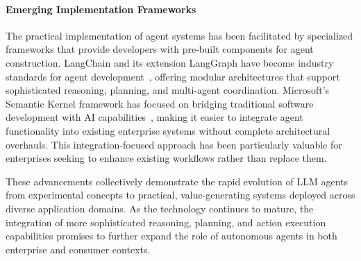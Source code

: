 \documentclass[10pt,preprint]{article}
\begin{document}

\paragraph{Emerging Implementation Frameworks}
The practical implementation of agent systems has been facilitated by specialized frameworks that provide developers with pre-built components for agent construction. LangChain and its extension LangGraph have become industry standards for agent development~\citep{langchain2024langgraph}, offering modular architectures that support sophisticated reasoning, planning, and multi-agent coordination.
Microsoft's Semantic Kernel framework has focused on bridging traditional software development with AI capabilities~\citep{microsoft2024semantic}, making it easier to integrate agent functionality into existing enterprise systems without complete architectural overhauls. This integration-focused approach has been particularly valuable for enterprises seeking to enhance existing workflows rather than replace them.

These advancements collectively demonstrate the rapid evolution of LLM agents from experimental concepts to practical, value-generating systems deployed across diverse application domains. As the technology continues to mature, the integration of more sophisticated reasoning, planning, and action execution capabilities promises to further expand the role of autonomous agents in both enterprise and consumer contexts.


\begin{table}[t]
\centering
\renewcommand{\arraystretch}{1.3} %
\caption{Comparison of the properties of different interaction manners for agents.}
\label{tab:interaction-comparison}
\end{table}
\end{document}
